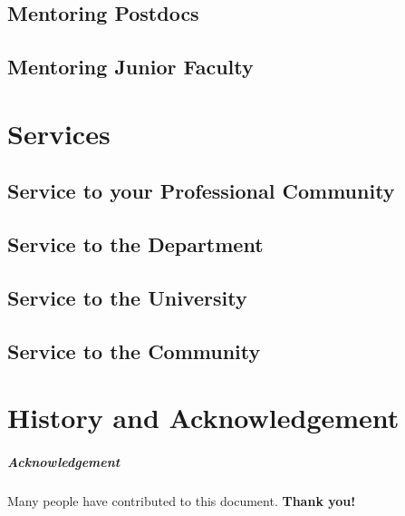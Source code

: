 \documentclass[oneside,11pt]{memoir}
\begin{document}
\section{Mentoring Postdocs}
\section{Mentoring Junior Faculty}

\chapter{Services}

\section{Service to your Professional Community}
\section{Service to the Department}
\section{Service to the University}
\section{Service to the Community}



\chapter{History and Acknowledgement}\label{sec:ack}


\paragraph{Acknowledgement} Many people have contributed to this document.
\textbf{Thank you!}



\end{document}
